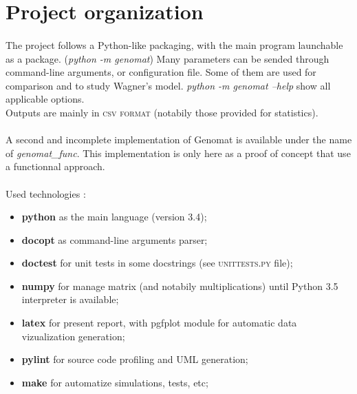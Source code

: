\documentclass[]{report} %
\begin{document}
\section*{Project organization}
	\paragraph*{}
        The project follows a Python-like packaging, with the main program launchable as a package. (\textit{python -m genomat})
        Many parameters can be sended through command-line arguments, or configuration file. Some of them are used for comparison and to study Wagner's model.
        \textit{python -m genomat --help} show all applicable options.\\
        Outputs are mainly in \textsc{csv format} (notabily those provided for statistics).

	\paragraph*{}
        A second and incomplete implementation of Genomat is available under the name of \textit{genomat\_func}. 
        This implementation is only here as a proof of concept that use a functionnal approach.

	\paragraph*{}
        Used technologies :
        \begin{itemize}
                \item \textbf{python} as the main language (version 3.4);
                \item \textbf{docopt} as command-line arguments parser;
                \item \textbf{doctest} for unit tests in some docstrings (see \textsc{unittests.py} file);
                \item \textbf{numpy} for manage matrix (and notabily multiplications) until Python 3.5 interpreter is available;
                \item \textbf{latex} for present report, with pgfplot module for automatic data vizualization generation;
                \item \textbf{pylint} for source code profiling and UML generation;
                \item \textbf{make} for automatize simulations, tests, etc;
        \end{itemize}
\end{document}
